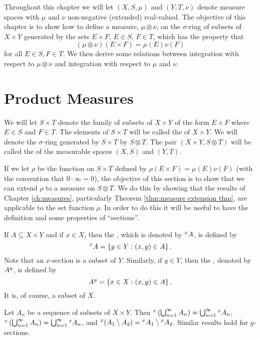 

Throughout this chapter we will let $(X,S,\mu)$ and $(Y,T,\nu)$ denote measure spaces with $\mu$ and $\nu$ non-negative (extended) real-valued. The objective of this chapter is to show how to define a measure, $\mu\otimes\nu$, on the $\sigma$-ring of subsets of $X\times Y$ generated by the sets $E\times F$, $E\in S$, $F\in T$, which has the property that \[(\mu\otimes\nu)(E\times F)=\mu(E)\nu(F)\] for all $E\in S,F\in T$. We then derive some relations between integration with respect to $\mu\otimes\nu$ and integration with respect to $\mu$ and $\nu$.

\section{Product Measures}

\begin{definition}
We will let $S\times T$ denote the family of subsets of $X\times Y$ of the form $E\times F$ where $E\in S$ and $F\in T$. The elements of $S\times T$ will be called the  of $X\times Y$. We will denote the $\sigma$-ring generated by $S\times T$ by $S\otimes T$. The pair $(X\times Y,S\otimes T)$ will be called the  of the measurable spaces $(X,S)$ and $(Y,T)$.
\end{definition}

If we let $\rho$ be the function on $S\times T$ defined by $\rho(E\times F)=\mu(E)\nu(F)$ (with the convention that $0\cdot\infty=0$), the objective of this section is to show that we can extend $\rho$ to a measure on $S\otimes T$. We do this by showing that the results of Chapter \ref{ch:measures}, particularly Theorem \ref{thm:measure extension thm}, are applicable to the set function $\rho$. In order to do this it will be useful to have the definition and some properties of ``sections''.

\begin{definition}
If $A\subseteq X\times Y$ and if $x\in X$, then the , which is denoted by $\xsec{A}{x}$, is defined by \[\xsec{A}{x}=\brc{y\in Y:(x,y)\in A}.\] Note that an $x$-section is a subset of $Y$. Similarly, if $y\in Y$, then the , denoted by $\ysec{A}{y}$, is defined by \[\ysec{A}{y}=\brc{x\in X:(x,y)\in A}.\] It is, of course, a subset of $X$.
\end{definition}

\begin{proposition}\label{prop:section preserve union intersection}
Let $A_n$ be a sequence of subsets of $X\times Y$. Then $\xsec{\br{\bigcup_{n=1}^\infty A_n}}{x}=\bigcup_{n=1}^\infty\xsec{A_n}{x}$, $\xsec{\br{\bigcup_{n=1}^\infty A_n}}{x}=\bigcup_{n=1}^\infty\xsec{A_n}{x}$, and $\xsec{(A_1\sd A_2)}{x}=\xsec{A_1}{x}\sd\xsec{A_2}{x}$. Similar results hold for $y$-sections.
\end{proposition}

